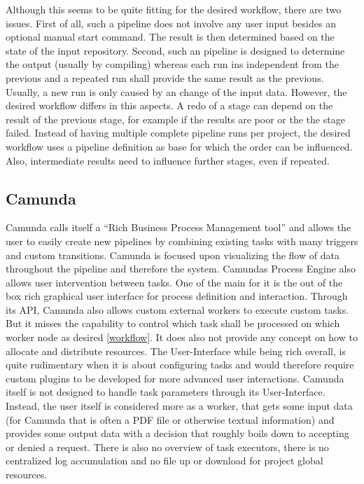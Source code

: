 Although this seems to be quite fitting for the desired workflow, there are two issues.
First of all, such a pipeline does not involve any user input besides an optional manual start command.
The result is then determined based on the state of the input repository.
Second, such an pipeline is designed to determine the output (usually by compiling) whereas each run ins independent from the previous and a repeated run shall provide the same result as the previous.
Usually, a new run is only caused by an change of the input data.
However, the desired workflow differs in this aspects.
A redo of a stage can depend on the result of the previous stage, for example if the results are poor or the the stage failed.
Instead of having multiple complete pipeline runs per project, the desired workflow uses a pipeline definition as base for which the order can be influenced.
Also, intermediate results need to influence further stages, even if repeated.


\subsection{Camunda}


\cite{camunda:main}



Camunda calls itself a \enquote{Rich Business Process Management tool} and allows the user to easily create new pipelines by combining existing tasks with many triggers and custom transitions. %
Camunda is focused upon visualizing the flow of data throughout the pipeline and therefore the system. %
Camundas Process Engine\cite{camunda:process_engine_api} also allows user intervention between tasks.
One of the main  for it is the out of the box rich graphical user interface for process definition and interaction.
Through its API\cite{camunda:rest_api_reference}, Camunda also allows custom external workers to execute custom tasks.
But it misses the capability to control which task shall be processed on which worker node as desired \ref{workflow}.
It does also not provide any concept on how to allocate and distribute resources.
The User-Interface while being rich overall, is quite rudimentary when it is about configuring tasks and would therefore require custom plugins to be developed for more advanced user interactions.
Camunda itself is not designed to handle task parameters through its User-Interface.
Instead, the user itself is considered more as a worker, that gets some input data (for Camunda that is often a PDF file or otherwise textual information) and provides some output data with a decision that roughly boils down to accepting or denied a request.
There is also no overview of task executors, there is no centralized log accumulation and no file up or download for project global resources.

